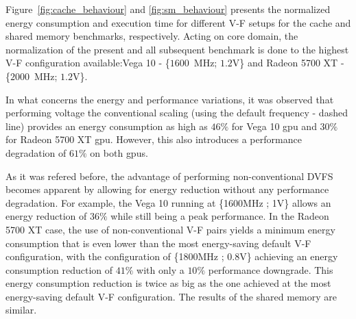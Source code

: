 \label{sec:cache_sm__behaviour}

Figure~\ref{fig:cache_behaviour} and \ref{fig:sm_behaviour} presents the normalized energy consumption and execution time for different V-F setups for the cache and shared memory benchmarks, respectively. Acting on core domain, the normalization of the present and all subsequent benchmark is done to the highest V-F configuration available:Vega 10 - \{$1600$~MHz; $1.2$V\} and Radeon 5700 XT - \{$2000$~MHz; $1.2$V\}.

In what concerns the energy and performance variations, it was observed that performing voltage the conventional scaling (using the default frequency - dashed line) provides an energy consumption as high as $46\% $ for Vega 10 \acrshort{gpu} and $30\% $ for Radeon 5700 XT \acrshort{gpu}. However, this also introduces a performance degradation of $61\%$ on both \acrshort{gpu}s. 

As it was refered before, the advantage of performing non-conventional DVFS becomes apparent by allowing for energy reduction without any performance degradation. For example, the Vega 10 running at \{1600MHz ; 1V\} allows an energy reduction of $36\%$ while still being a peak performance.
In the Radeon 5700 XT case, the use of non-conventional V-F pairs yields a minimum energy consumption that is even lower than the most energy-saving default V-F configuration, with the configuration of \{1800MHz ; 0.8V\} achieving an energy consumption reduction of $41\%$ with only a $10\%$ performance downgrade. This energy consumption reduction is twice as big as the one achieved at the most energy-saving default V-F configuration.
The results of the shared memory are similar.

